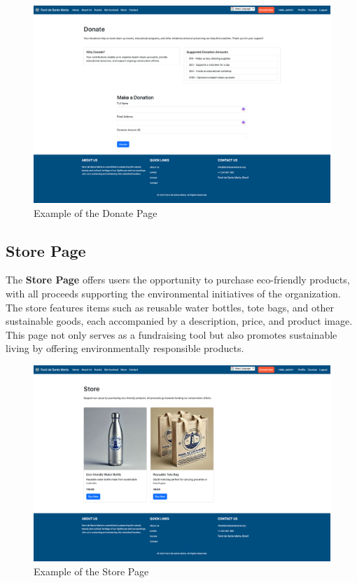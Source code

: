 \begin{figure}[H]
    \centering
    \includegraphics[width=\textwidth]{images/donate-page.png}
    \caption{Example of the Donate Page}
    \label{fig:donate_page}
\end{figure}

\subsection{Store Page}

The \textbf{Store Page} offers users the opportunity to purchase eco-friendly products, with all proceeds supporting the environmental initiatives of the organization. The store features items such as reusable water bottles, tote bags, and other sustainable goods, each accompanied by a description, price, and product image. This page not only serves as a fundraising tool but also promotes sustainable living by offering environmentally responsible products.

\begin{figure}[H]
    \centering
    \includegraphics[width=\textwidth]{images/store-page.png}
    \caption{Example of the Store Page}
    \label{fig:store_page}
\end{figure}


